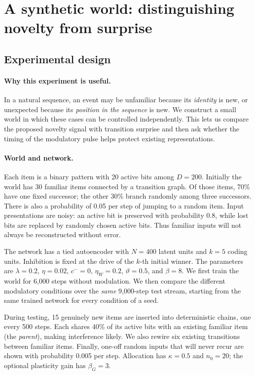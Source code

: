 \documentclass[11pt,a4paper]{article}
\begin{document}
\section{A synthetic world: distinguishing novelty from surprise}\label{sec:toy}

\subsection{Experimental design}
\paragraph{Why this experiment is useful.}
In a natural sequence, an event may be unfamiliar because its \emph{identity} is new, or unexpected because its \emph{position in the sequence} is new. We construct a small world in which these cases can be controlled independently. This lets us compare the proposed novelty signal with transition surprise and then ask whether the timing of the modulatory pulse helps protect existing representations.

\paragraph{World and network.}
Each item is a binary pattern with 20 active bits among $D=200$. Initially the world has 30 familiar items connected by a transition graph. Of those items, 70\% have one fixed successor; the other 30\% branch randomly among three successors. There is also a probability of 0.05 per step of jumping to a random item. Input presentations are noisy: an active bit is preserved with probability 0.8, while lost bits are replaced by randomly chosen active bits. Thus familiar inputs will not always be reconstructed without error.

The network has a tied autoencoder with $N=400$ latent units and $k=5$ coding units. Inhibition is fixed at the drive of the $k$-th initial winner. The parameters are $\lambda=0.2$, $\eta=0.02$, $c^-=0$, $\eta_W=0.2$, $\vartheta=0.5$, and $\beta=8$. We first train the world for 6{,}000 steps without modulation. We then compare the different modulatory conditions over the \emph{same} 9{,}000-step test stream, starting from the same trained network for every condition of a seed.

During testing, 15 genuinely new items are inserted into deterministic chains, one every 500 steps. Each shares 40\% of its active bits with an existing familiar item (the \emph{parent}), making interference likely. We also rewire six existing transitions between familiar items. Finally, one-off random inputs that will never recur are shown with probability 0.005 per step. Allocation has $\kappa=0.5$ and $n_0=20$; the optional plasticity gain has $\beta_G=3$.
\end{document}
